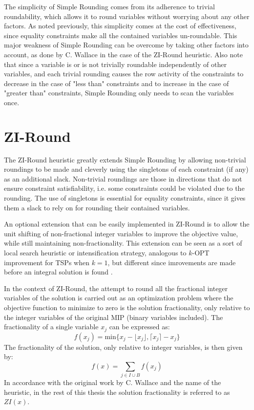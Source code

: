 \documentclass[a4paper,12pt]{book}
\begin{document}
The simplicity of Simple Rounding comes from its adherence to trivial roundability, which allows it to round variables without worrying about any other factors. As noted previously, this simplicity comes at the cost of effectiveness, since equality constraints make all the contained variables un-roundable. This major weakness of Simple Rounding can be overcome by taking other factors into account, as done by C. Wallace \cite{wallace2010} in the case of the ZI-Round heuristic. Also note that since a variable is or is not trivially roundable independently of other variables, and each trivial rounding causes the row activity of the constraints to decrease in the case of "less than" constraints and to increase in the case of "greater than" constraints, Simple Rounding only needs to scan the variables once.

\section{ZI-Round}
The ZI-Round heuristic greatly extends Simple Rounding by allowing non-trivial roundings to be made and cleverly using the singletons of each constraint (if any) as an additional slack. Non-trivial roundings are those in directions that do not ensure constraint satisfiability, i.e. some constraints could be violated due to the rounding. The use of singletons is essential for equality constraints, since it gives them a slack to rely on for rounding their contained variables. \par

An optional extension that can be easily implemented in ZI-Round is to allow the unit shifting of non-fractional integer variables to improve the objective value, while still maintaining non-fractionality. This extension can be seen as a sort of local search heuristic \cite{linker1973} or intensification strategy, analogous to $k$-OPT improvement for TSPs when $k = 1$, but different since imrovements are made before an integral solution is found \cite{wallace2010}. \par

In the context of ZI-Round, the attempt to round all the fractional integer variables of the solution is carried out as an optimization problem where the objective function to minimize to zero is the solution fractionality, only relative to the integer variables of the original MIP (binary variables included). The fractionality of a single variable $x_j$ can be expressed as:
\begin{equation}
	f(x_j) = \text{min}\{x_j - \lfloor x_j \rfloor, \lceil x_j \rceil - x_j\}
\end{equation}
The fractionality of the solution, only relative to integer variables, is then given by:
\begin{equation}\label{eq:zi}
	f(x) = \sum_{j \in I \cup B}f(x_j)
\end{equation}
In accordance with the original work by C. Wallace \cite{wallace2010} and the name of the heuristic, in the rest of this thesis the solution fractionality is referred to as $ZI(x)$. \par 
\end{document}
